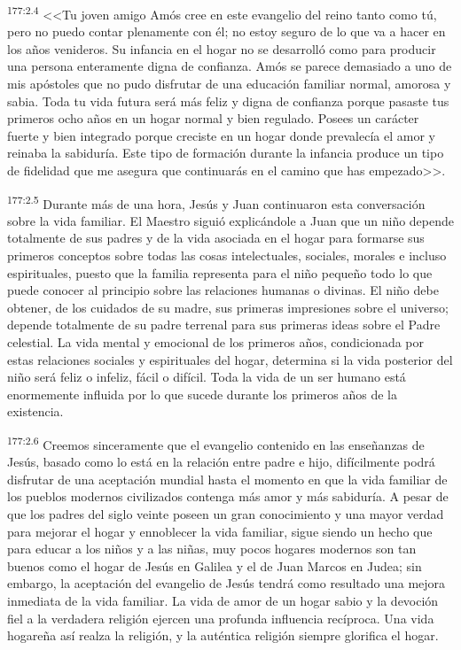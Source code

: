 \par 
\textsuperscript{177:2.4} <<Tu joven amigo Amós cree en este evangelio del reino tanto como tú, pero no puedo contar plenamente con él; no estoy seguro de lo que va a hacer en los años venideros. Su infancia en el hogar no se desarrolló como para producir una persona enteramente digna de confianza. Amós se parece demasiado a uno de mis apóstoles que no pudo disfrutar de una educación familiar normal, amorosa y sabia. Toda tu vida futura será más feliz y digna de confianza porque pasaste tus primeros ocho años en un hogar normal y bien regulado. Posees un carácter fuerte y bien integrado porque creciste en un hogar donde prevalecía el amor y reinaba la sabiduría. Este tipo de formación durante la infancia produce un tipo de fidelidad que me asegura que continuarás en el camino que has empezado>>.

\par 
\textsuperscript{177:2.5} Durante más de una hora, Jesús y Juan continuaron esta conversación sobre la vida familiar. El Maestro siguió explicándole a Juan que un niño depende totalmente de sus padres y de la vida asociada en el hogar para formarse sus primeros conceptos sobre todas las cosas intelectuales, sociales, morales e incluso espirituales, puesto que la familia representa para el niño pequeño todo lo que puede conocer al principio sobre las relaciones humanas o divinas. El niño debe obtener, de los cuidados de su madre, sus primeras impresiones sobre el universo; depende totalmente de su padre terrenal para sus primeras ideas sobre el Padre celestial. La vida mental y emocional de los primeros años, condicionada por estas relaciones sociales y espirituales del hogar, determina si la vida posterior del niño será feliz o infeliz, fácil o difícil. Toda la vida de un ser humano está enormemente influida por lo que sucede durante los primeros años de la existencia.

\par 
\textsuperscript{177:2.6} Creemos sinceramente que el evangelio contenido en las enseñanzas de Jesús, basado como lo está en la relación entre padre e hijo, difícilmente podrá disfrutar de una aceptación mundial hasta el momento en que la vida familiar de los pueblos modernos civilizados contenga más amor y más sabiduría. A pesar de que los padres del siglo veinte poseen un gran conocimiento y una mayor verdad para mejorar el hogar y ennoblecer la vida familiar, sigue siendo un hecho que para educar a los niños y a las niñas, muy pocos hogares modernos son tan buenos como el hogar de Jesús en Galilea y el de Juan Marcos en Judea; sin embargo, la aceptación del evangelio de Jesús tendrá como resultado una mejora inmediata de la vida familiar. La vida de amor de un hogar sabio y la devoción fiel a la verdadera religión ejercen una profunda influencia recíproca. Una vida hogareña así realza la religión, y la auténtica religión siempre glorifica el hogar.

